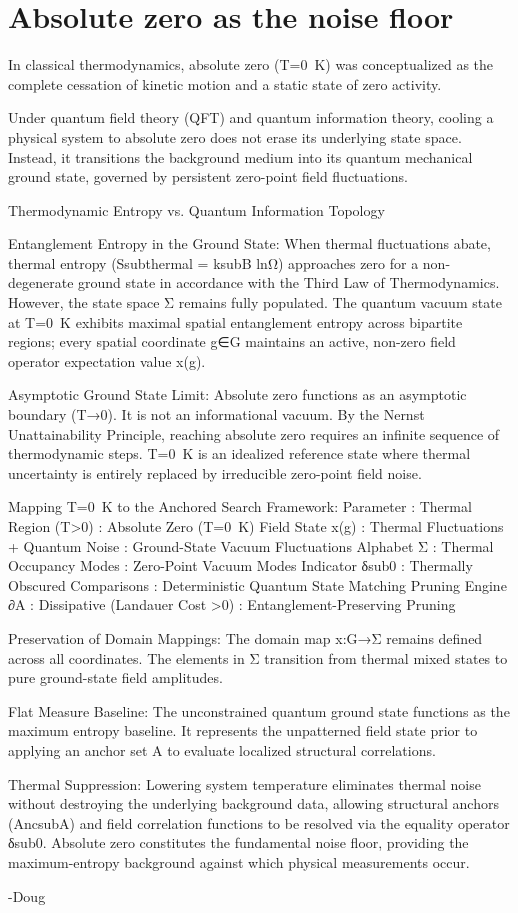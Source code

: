 \chapter{Absolute zero as the noise floor}

In classical thermodynamics, absolute zero (T=0 K) was conceptualized as the complete cessation of kinetic motion and a static state of zero activity.

Under quantum field theory (QFT) and quantum information theory, cooling a physical system to absolute zero does not erase its underlying state space. Instead, it transitions the background medium into its quantum mechanical ground state, governed by persistent zero-point field fluctuations.

Thermodynamic Entropy vs. Quantum Information Topology

Entanglement Entropy in the Ground State: When thermal fluctuations abate, thermal entropy (Ssubthermal = ksubB lnΩ) approaches zero for a non-degenerate ground state in accordance with the Third Law of Thermodynamics. However, the state space Σ remains fully populated. The quantum vacuum state at T=0 K exhibits maximal spatial entanglement entropy across bipartite regions; every spatial coordinate g∈G maintains an active, non-zero field operator expectation value x(g).

Asymptotic Ground State Limit: Absolute zero functions as an asymptotic boundary (T→0). It is not an informational vacuum. By the Nernst Unattainability Principle, reaching absolute zero requires an infinite sequence of thermodynamic steps. T=0 K is an idealized reference state where thermal uncertainty is entirely replaced by irreducible zero-point field noise.

Mapping T=0 K to the Anchored Search Framework: Parameter : Thermal Region (T>0) : Absolute Zero (T=0 K) Field State x(g) : Thermal Fluctuations + Quantum Noise	: Ground-State Vacuum Fluctuations Alphabet Σ : Thermal Occupancy Modes : Zero-Point Vacuum Modes Indicator δsub0 : Thermally Obscured Comparisons : Deterministic Quantum State Matching Pruning Engine ∂A : Dissipative (Landauer Cost >0) : Entanglement-Preserving Pruning

Preservation of Domain Mappings: The domain map x:G→Σ remains defined across all coordinates. The elements in Σ transition from thermal mixed states to pure ground-state field amplitudes.

Flat Measure Baseline: The unconstrained quantum ground state functions as the maximum entropy baseline. It represents the unpatterned field state prior to applying an anchor set A to evaluate localized structural correlations.

Thermal Suppression: Lowering system temperature eliminates thermal noise without destroying the underlying background data, allowing structural anchors (AncsubA​) and field correlation functions to be resolved via the equality operator δsub0. Absolute zero constitutes the fundamental noise floor, providing the maximum-entropy background against which physical measurements occur.

-Doug

